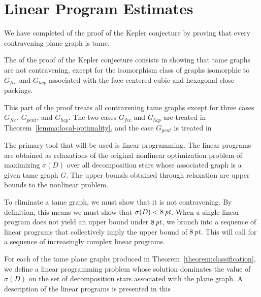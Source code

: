 
\chapter{Linear Program Estimates}


\label{sec:linearprogram}

We have completed  of the proof of the Kepler conjecture by proving that every
contravening plane graph is tame.

The  of the
proof of the Kepler conjecture consists in showing that tame graphs
are not contravening, except for the isomorphism class of graphs
isomorphic to $G_{fcc}$ and $G_{hcp}$ associated with the
face-centered cubic and hexagonal close packings.

This part of the proof treats all contravening tame graphs except
for three cases $G_{fcc}$, $G_{pent}$, and
$G_{hcp}$. The two cases $G_{fcc}$ and $G_{hcp}$ are treated in
Theorem~\ref{lemma:local-optimality},  and the case
$G_{pent}$ is treated in

The primary tool that will be used is linear programming. The
linear programs are obtained as relaxations of the original
nonlinear optimization problem of maximizing $\sigma(D)$ over all
decomposition stars whose associated graph is a given tame graph
$G$.  The upper bounds obtained through relaxation are upper
bounds to the nonlinear problem.

To eliminate a tame graph, we must show that it is not
contravening. By definition, this means we must show that
$\sigma(D) < 8\,\hbox{\it pt}$.  When a single linear program does not yield
an upper bound under $8\,\hbox{\it pt}$, we branch into a sequence of linear
programs that collectively imply the upper bound of $8\,\hbox{\it pt}$. This
will call for a sequence of increasingly complex linear programs.


For each of the tame plane graphs produced in
Theorem~\ref{theorem:classification}, we define a linear
programming problem whose solution dominates the value of
$\sigma(D)$ on the set of decomposition stars associated with the
plane graph. A description of the linear programs is presented in
this \chap.

